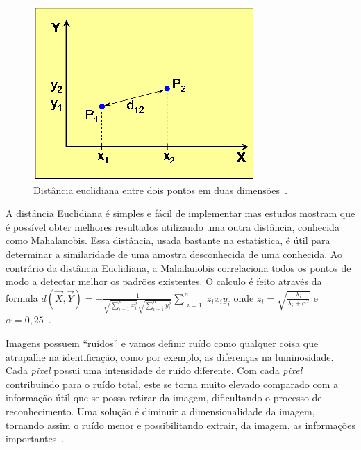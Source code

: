     \begin{figure}[H]
		\begin{center}
			\includegraphics[scale=1.0]{figuras/2.FundamentacaoTeorica/graficoDistanciaEntrePontos.png}
		\end{center}
		\caption{Distância euclidiana entre dois pontos em duas dimensões~\cite{hewitt}.}
		\label{distanciaEntrePontos}
	\end{figure}

	A distância Euclidiana é simples e fácil de implementar mas estudos mostram que
	é possível obter melhores resultados utilizando uma outra distância, conhecida
	como Mahalanobis. Essa distância, usada bastante na estatística, é útil para
	determinar a similaridade de uma amostra desconhecida de uma conhecida. Ao
	contrário da distância Euclidiana, a Mahalanobis correlaciona todos os pontos de
	modo a detectar melhor os padrões existentes. O calculo é feito através da
	formula $\displaystyle d(\vec{X}, \vec{Y}) =  - \frac{1}{\sqrt{\sum_{i=1}^{n}
	x_i^2} \sqrt{\sum_{i=1}^{n} y_i^2}}   \sum_{\substack{i=1}}^{n} z_ix_iy_i$ onde
	$\displaystyle z_i = \sqrt{\frac{\lambda_i}{\lambda_i + \alpha^2}}$ e
	$\displaystyle \alpha = 0,25$~\cite{perlibakas}.
	
	Imagens possuem ``ruídos'' e vamos definir ruído como qualquer coisa que
	atrapalhe na identificação, como por exemplo, as diferenças na luminosidade.
	Cada \textit{pixel} possui uma intensidade de ruído diferente. Com cada
	\textit{pixel} contribuindo para o ruído total, este se torna muito elevado
	comparado com a informação útil que se possa retirar da imagem, dificultando o
	processo de reconhecimento. Uma solução é diminuir a dimensionalidade da imagem,
	tornando assim o ruído menor e possibilitando extrair, da imagem, as informações
	importantes~\cite{hewitt}.
	
